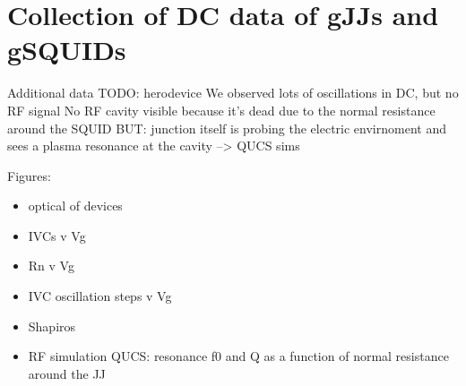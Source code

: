 \chapter{Collection of DC data of gJJs and gSQUIDs}
\label{chap:gJJmisc}

%
%

\newpage

Additional data
TODO: herodevice
We observed lots of oscillations in DC, but no RF signal
No RF cavity visible because it's dead due to the normal resistance around the SQUID
BUT: junction itself is probing the electric envirnoment and sees a plasma resonance at the cavity --> QUCS sims

Figures:
\begin{itemize}
	\item optical of devices
	\item IVCs v Vg
	\item Rn v Vg
	\item IVC oscillation steps v Vg
	\item Shapiros
	\item RF simulation QUCS: resonance f0 and Q as a function of normal resistance around the JJ
\end{itemize}



